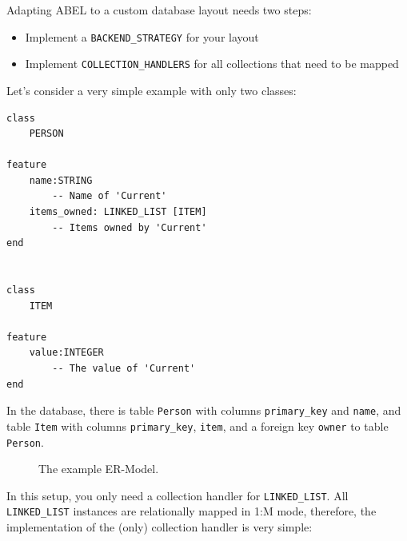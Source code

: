Adapting ABEL to a custom database layout needs two steps:
 \begin{itemize}
  \item Implement a \lstinline!BACKEND_STRATEGY! for your layout
  \item Implement \lstinline!COLLECTION_HANDLERS! for all collections that need to be mapped
 \end{itemize}

Let's consider a very simple example with only two classes:

\begin{lstlisting}[language=OOSC2Eiffel, captionpos=b, caption={Example classes}, label={lst:example_application}]
class
	PERSON

feature
	name:STRING
		-- Name of 'Current'
	items_owned: LINKED_LIST [ITEM]
		-- Items owned by 'Current'
end


class 
	ITEM

feature
	value:INTEGER
		-- The value of 'Current'
end
\end{lstlisting}

In the database, there is table \lstinline!Person! with columns \lstinline!primary_key! and \lstinline!name!, 
and table \lstinline!Item! with columns \lstinline!primary_key!, \lstinline!item!, and a foreign key \lstinline!owner! to table \lstinline!Person!.


\begin{figure} [h!]
\centering
{}
\caption{The example ER-Model.}
\label{fig:er_model_example}
\end{figure}

In this setup, you only need a collection handler for \lstinline!LINKED_LIST!.
All \lstinline!LINKED_LIST! instances are relationally mapped in 1:M mode, therefore, the implementation of the (only) collection handler is very simple:

